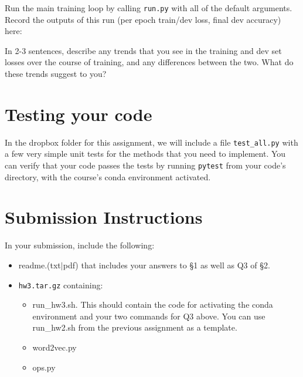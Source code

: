 \documentclass[11pt]{article}
\begin{document}
\vspace{2em}
 Run the main training loop by calling \texttt{run.py} with all of the default arguments.  Record the outputs of this run (per epoch train/dev loss, final dev accuracy) here:

\vspace{2em}

\noindent In 2-3 sentences, describe any trends that you see in the training and dev set losses over the course of training, and any differences between the two.  What do these trends suggest to you?


\section{Testing your code}

In the dropbox folder for this assignment, we will include a file \texttt{test\_all.py} with a few very simple unit tests for the methods that you need to implement.  You can verify that your code passes the tests by running \texttt{pytest} from your code's directory, with the course's conda environment activated.


\section*{Submission Instructions}

In your submission, include the following:
\begin{itemize}
  \item readme.(txt$\mid$pdf) that includes your answers to \S1 as well as Q3 of \S2. 
  \item \texttt{hw3.tar.gz} containing:
  \begin{itemize}
    \item run\_hw3.sh.  This should contain the code for activating the conda environment and your two commands for Q3 above.  You can use run\_hw2.sh from the previous assignment as a template.
    \item word2vec.py
    \item ops.py
  \end{itemize}
\end{itemize}
\end{document}
